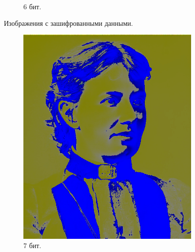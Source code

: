 \documentclass[11pt,a4paper,final]{article} %
\begin{document}
\begin{figure}[h!]
\begin{subfigure}[b]{0.3\linewidth}
		\caption{6 бит.}
		\label{fig:s6}
	\end{subfigure}
	
	\caption{Изображения с зашифрованными данными.}
	\label{fig:new1}
\end{figure}

\begin{figure}[h!]
	\centering
	
	\begin{subfigure}[b]{0.3\linewidth}
		\centering
		\includegraphics[width=\linewidth]{img/sofya2-7-5.jpg}
		\caption{7 бит.}
		\label{fig:s7}
	\end{subfigure}
	\hspace{0.05\linewidth} %
	\begin{subfigure}[b]{0.3\linewidth}
		\centering

\end{subfigure}
\end{figure}
\end{document}
